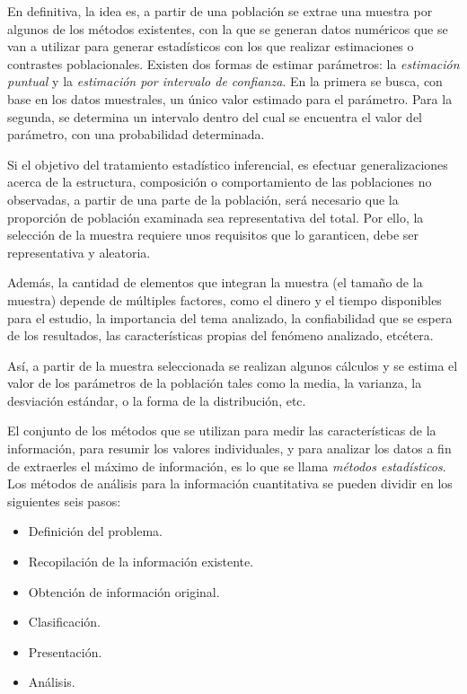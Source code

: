 \documentclass[a4paper]{report} %
\begin{document}
En definitiva, la idea es, a partir de una poblaci\'on se extrae una muestra por algunos de los m\'etodos existentes, con la que se generan datos num\'ericos que se van a utilizar para generar estad\'isticos con los que realizar estimaciones o contrastes poblacionales. Existen dos formas de estimar par\'ametros: la \textit{estimaci\'on puntual} y la \textit{estimaci\'on por intervalo de confianza}. En la primera se busca, con base en los datos muestrales, un \'unico valor estimado para el par\'ametro. Para la segunda, se determina un intervalo dentro del cual se encuentra el valor del par\'ametro, con una probabilidad determinada.

Si el objetivo del tratamiento estad\'istico inferencial, es efectuar generalizaciones acerca de la estructura, composici\'on o comportamiento de las poblaciones no observadas, a partir de una parte de la poblaci\'on, ser\'a necesario que la proporci\'on de poblaci\'on examinada sea representativa del total. Por ello, la selecci\'on de la muestra requiere unos requisitos que lo garanticen, debe ser representativa y aleatoria. 

Adem\'as, la cantidad de elementos que integran la muestra (el tama\~no de la muestra) depende de m\'ultiples factores, como el dinero y el tiempo disponibles para el estudio, la importancia del tema analizado, la confiabilidad que se espera de los resultados, las caracter\'isticas propias del fen\'omeno analizado, etc\'etera. 

As\'i, a partir de la muestra seleccionada se realizan algunos c\'alculos y se estima el valor de los par\'ametros de la poblaci\'on tales como la media, la varianza, la desviaci\'on est\'andar, o la forma de la distribuci\'on, etc.


El conjunto de los m\'etodos que se utilizan para medir las caracter\'isticas de la informaci\'on, para resumir los valores individuales, y para analizar los datos a fin de extraerles el m\'aximo de informaci\'on, es lo que se llama \textit{m\'etodos estad\'isticos}. Los m\'etodos de an\'alisis para la informaci\'on cuantitativa se pueden dividir en los siguientes seis pasos:

\begin{itemize}
    \item Definici\'on del problema.
    \item Recopilaci\'on de la informaci\'on existente.
    \item Obtenci\'on de informaci\'on original.
    \item Clasificaci\'on.
    \item Presentaci\'on.
    \item An\'alisis.
\end{itemize}
\end{document}
